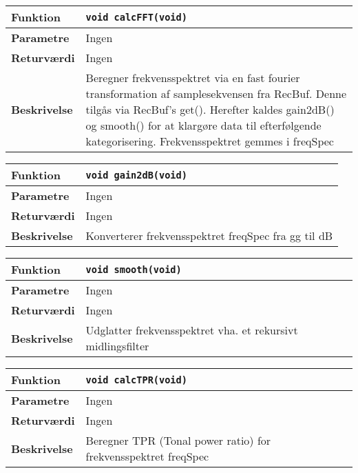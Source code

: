 \begin{center}
    \begin{tabular}{ | l | p{} |}
    \hline
    \textbf{Funktion}	& \verb+void calcFFT(void) +						\\ \hline
    \textbf{Parametre} 	& Ingen		\\ \hline
    \textbf{Returværdi}	& Ingen							\\ \hline
    \textbf{Beskrivelse}& Beregner frekvensspektret via en fast fourier transformation af samplesekvensen fra RecBuf. Denne tilgås via RecBuf's get(). Herefter kaldes gain2dB() og smooth() for at klargøre data til efterfølgende kategorisering. Frekvensspektret gemmes i freqSpec\\ \hline
    \end{tabular}
\end{center}

\begin{center}
    \begin{tabular}{ | l | p{} |}
    \hline
    \textbf{Funktion}	& \verb+void gain2dB(void) +						\\ \hline
    \textbf{Parametre} 	& Ingen		\\ \hline
    \textbf{Returværdi}	& Ingen							\\ \hline
    \textbf{Beskrivelse}& Konverterer frekvensspektret freqSpec fra gg til dB \\ \hline
    \end{tabular}
\end{center}  

\begin{center}
    \begin{tabular}{ | l | p{} |}
    \hline
    \textbf{Funktion}	& \verb+void smooth(void) +						\\ \hline
    \textbf{Parametre} 	& Ingen		\\ \hline
    \textbf{Returværdi}	& Ingen							\\ \hline
    \textbf{Beskrivelse}& Udglatter frekvensspektret vha. et rekursivt midlingsfilter  \\ \hline
    \end{tabular}
\end{center}

\begin{center}
    \begin{tabular}{ | l | p{} |}
    \hline
    \textbf{Funktion}	& \verb+void calcTPR(void) +						\\ \hline
    \textbf{Parametre} 	& Ingen		\\ \hline
    \textbf{Returværdi}	& Ingen							\\ \hline
    \textbf{Beskrivelse}& Beregner TPR (Tonal power ratio) for frekvensspektret freqSpec  \\ \hline
    \end{tabular}
\end{center} 


